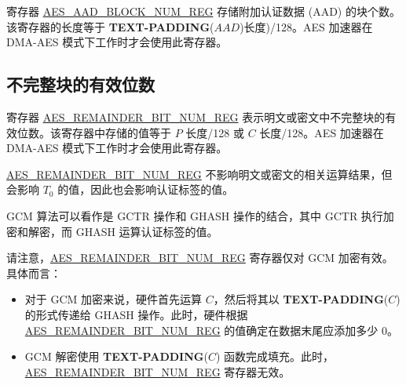 \documentclass[main\_\_CN.tex]{subfiles}
\begin{document}
寄存器 \hyperref[regdesc:AESAADBLOCKNUMREG]{AES\_AAD\_BLOCK\_NUM\_REG} 存储附加认证数据 (AAD) 的块个数。该寄存器的长度等于 {\bfseries TEXT-PADDING}($AAD$)长度)/128。AES 加速器在 DMA-AES 模式下工作时才会使用此寄存器。


\subsection{不完整块的有效位数}\label{sec:aes-remainder-bit-number}


寄存器 \hyperref[regdesc:AESREMAINDERBITNUMREG]{AES\_REMAINDER\_BIT\_NUM\_REG} 表示明文或密文中不完整块的有效位数。该寄存器中存储的值等于 $P$ 长度/128 或 $C$ 长度/128。AES 加速器在 DMA-AES 模式下工作时才会使用此寄存器。

\hyperref[regdesc:AESREMAINDERBITNUMREG]{AES\_REMAINDER\_BIT\_NUM\_REG} 不影响明文或密文的相关运算结果，但会影响 $T_{0}$ 的值，因此也会影响认证标签的值。

GCM 算法可以看作是 GCTR 操作和 GHASH 操作的结合，其中 GCTR 执行加密和解密，而 GHASH 运算认证标签的值。

请注意，\hyperref[regdesc:AESREMAINDERBITNUMREG]{AES\_REMAINDER\_BIT\_NUM\_REG} 寄存器仅对 GCM 加密有效。具体而言：

\begin{itemize}
    \item 对于 GCM 加密来说，硬件首先运算 $C$，然后将其以 {\bfseries TEXT-PADDING}($C$) 的形式传递给 GHASH 操作。此时，硬件根据 \hyperref[regdesc:AESREMAINDERBITNUMREG]{AES\_REMAINDER\_BIT\_NUM\_REG} 的值确定在数据末尾应添加多少 0。
    \item GCM 解密使用 {\bfseries TEXT-PADDING}($C$) 函数完成填充。此时，\hyperref[regdesc:AESREMAINDERBITNUMREG]{AES\_REMAINDER\_BIT\_NUM\_REG} 寄存器无效。
\end{itemize}
\end{document}
